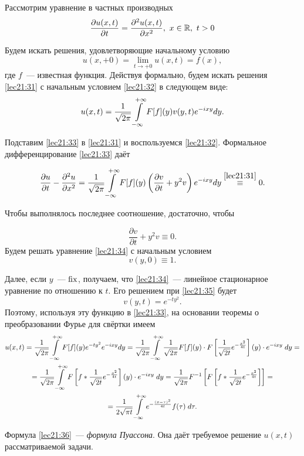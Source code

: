 \documentclass[../../main.tex]{subfiles}
\begin{document}
\begin{example}
Рассмотрим уравнение в частных производных
\begin{equation}
\label{lec21:31}
\frac{\partial u(x,t)}{\partial t} = \frac{\partial^2 u(x,t)}{\partial x^2}, 
\ x\in \mathbb{R}, \ t > 0
\end{equation}

Будем искать решения, удовлетворяющие начальному условию
\begin{equation}
  \label{lec21:32}
  u(x,+0) = \lim_{t\to+0} u(x,t) = f(x),
\end{equation}
где $f$~--- известная функция.
Действуя формально, будем искать решения \eqref{lec21:31}  с начальным 
условием \eqref{lec21:32} в следующем виде:
\begin{equation}
  \label{lec21:33}
  u(x, t) = \frac{1}{\sqrt{2\pi}} \int\limits_{-\infty}^{+\infty} F[f](y)v(y,t)e^{-ixy}dy.
\end{equation}

Подставим \eqref{lec21:33} в \eqref{lec21:31} и воспользуемся 
\eqref{lec21:32}. 
Формальное дифференцирование \eqref{lec21:33} даёт

\[\frac{\partial u}{\partial t} - \frac{\partial^2 u}{\partial x^2} = 
\frac{1}{\sqrt{2\pi}} \int\limits_{-\infty}^{+\infty} F[f](y)\left(\frac{\partial v}{\partial t} + 
y^2v\right)e^{-ixy}dy \stackrel{\eqref{lec21:31}}{\equiv} 0.\]

Чтобы выполнялось последнее соотношение, достаточно, чтобы

\begin{equation}
\label{lec21:34}
\frac{\partial v}{\partial t} + y^2v \equiv 0.
\end{equation}
Будем решать уравнение \eqref{lec21:34} с начальным условием
\begin{equation}
\label{lec21:35}
v(y,0) \equiv 1.
\end{equation}

Далее, если $y$~--- $\operatorname{fix}$, получаем, что \eqref{lec21:34}~--- линейное 
стационарное уравнение по отношению к $t$. Его решением при \eqref{lec21:35} 
будет
\[v(y,t) = e^{-ty^2}.\]
Поэтому, используя эту функцию в \eqref{lec21:33}, на основании теоремы 
о преобразовании Фурье для свёртки имеем
\begin{multline}
  \label{lec21:36}
  u(x,t) = \frac{1}{\sqrt{2\pi}} \int\limits_{-\infty}^{+\infty} F[f](y)e^{-ty^2}e^{-ixy}dy =
  \frac{1}{\sqrt{2\pi}} \int\limits_{-\infty}^{+\infty} \frac1{\sqrt{2\pi}}F[f](y)\cdot 
  F\left[\frac{1}{\sqrt{2t}}e^{-\frac{x^2}{4t}}\right](y) \cdot e^{-ixy}
  \;dy =\\=
  \frac{1}{\sqrt{2\pi}} \int\limits_{-\infty}^{+\infty} F\left[f * 
  \frac{1}{\sqrt{2t}}e^{-\frac{x^2}{4t}}
  \right](y)\cdot e^{-ixy}\;dy = \frac{1}{\sqrt{2\pi}} 
  F^{-1}\left[F\left[f*\frac{1}{\sqrt{2t}}e^{-\frac{x^2}{4t}}\right]\right] =\\=
  \frac{1}{2\sqrt{\pi t}} \int\limits_{-\infty}^{+\infty} e^{-\frac{(x-\tau)^2}{4t}}f(\tau)\;d\tau.
\end{multline}

Формула \eqref{lec21:36}~--- \emph{формула Пуассона}. Она даёт требуемое 
решение $u(x,t)$ рассматриваемой задачи.
\end{example}
\end{document}
